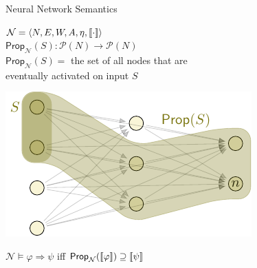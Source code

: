 \documentclass[12pt,t]{beamer}
\theoremstyle{definition}
\newcommand{\semantics}[1]{[\![\mbox{\em $ #1 $\/}]\!]}
\newcommand{\Model}{\mathcal{M}}
\newcommand{\Net}{\mathcal{N}}
\newcommand{\Best}{\mathsf{Best}}
\newcommand{\Prop}{\mathsf{Prop}}
\begin{document}
\begin{frame}{Neural Network Semantics}
\vspace{1ex}
\centering
\pause

    
    
    $\Net = \langle N, E, W, A, \eta, \semantics{\cdot} \rangle$
    \vspace{1ex}\\

    $\Prop_\Net(S): \mathcal{P}(N) \to \mathcal{P}(N)$
    \vspace{1ex}\\

    $\Prop_\Net(S) =$ the set of all nodes that are\\ eventually activated on input $S$
    \vspace{2ex}
    
    \includegraphics{fig-prop.pdf}

    \vspace{2ex}
    $\Net \models \varphi \Rightarrow \psi$ iff $\Prop_\Net(\semantics{\varphi}) \supseteq \semantics{\psi}$

\end{frame}
\end{document}
